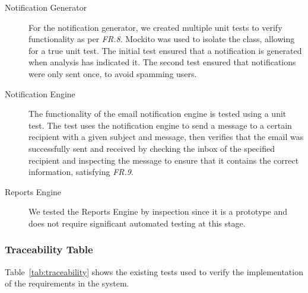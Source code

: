 \documentclass[10pt,a4paper]{article}
\newcommand{\frit}[1]{\textit{FR.#1}}
\begin{document}
\begin{description}
  \item[Notification Generator] For the notification generator, we created 
	multiple unit tests to verify functionality as per \frit{8}. Mockito was 
	used to isolate the class, allowing for a true unit test. The initial 
	test ensured that a notification is generated when analysis has indicated 
	it. The second test ensured that notifications were only sent once, to 
	avoid spamming users.	 
  
  \item[Notification Engine] The functionality of the email notification 
	engine is tested using a unit test. The test uses the notification engine 
	to send a message to a certain recipient with a given subject and
	message, then verifies that the email was successfully sent and 
	received by checking the inbox of the specified recipient and 
	inspecting the message to ensure that it contains the correct 
	information, satisfying \frit{9}.

  \item[Reports Engine] We tested the Reports Engine by inspection since it 
	is a prototype and does not require significant automated testing at this 
	stage.

 \end{description}

\subsubsection{Traceability Table}

Table~\ref{tab:traceability} shows the existing tests used to verify the implementation of the requirements in the system.
\end{document}
